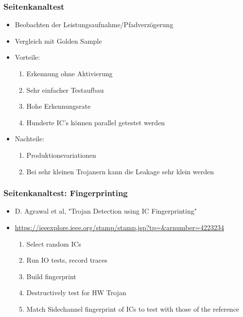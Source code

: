 \documentclass[11pt]{beamer}
\begin{document}
\begin{frame}
    \frametitle{Seitenkanaltest}
    \begin{itemize}
        \item Beobachten der Leistungsaufnahme/Pfadverzögerung \item Vergleich mit Golden Sample
        \item Vorteile:
        \begin{enumerate}
            \item Erkennung ohne Aktivierung
            \item Sehr einfacher Testaufbau
            \item Hohe Erkennungsrate
            \item Hunderte IC's können parallel getestet werden
        \end{enumerate}
        \item Nachteile:
        \begin{enumerate}
            \item Produktionsvariationen
            \item Bei sehr kleinen Trojanern kann die Leakage sehr klein werden
        \end{enumerate}
    \end{itemize}
\end{frame}
\begin{frame}
    \frametitle{Seitenkanaltest: Fingerprinting}
    \begin{itemize}
        \item D. Agrawal et al, "Trojan Detection using IC Fingerprinting"
        \item \url{https://ieeexplore.ieee.org/stamp/stamp.jsp?tp=&arnumber=4223234}
        \begin{enumerate}
            \item Select random ICs
            \item Run IO tests, record traces
            \item Build fingerprint
            \item Destructively test for HW Trojan
            \item Match Sidechannel fingerprint of ICs to test with those of the reference
        \end{enumerate}
    \end{itemize}
\end{frame}
\end{document}
